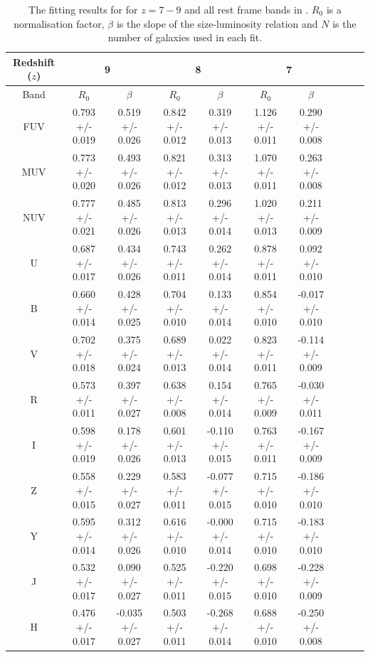 \begin{table}
\begin{center}
\begin{tabular}{ c | c | c | c | c | c | c | c | c | c }
 \hline
 Redshift ($z$) & \multicolumn{2}{|c|}{9} & \multicolumn{2}{|c|}{8} & \multicolumn{2}{|c|}{7} \\ \hline
 Band & $R_0$ & $\beta$& $R_0$ & $\beta$ & $R_0$ & $\beta$ \\ \hline
 FUV 
 & 0.793 +/- 0.019 & 0.519 +/- 0.026
 & 0.842 +/- 0.012 & 0.319 +/- 0.013
 & 1.126 +/- 0.011 & 0.290 +/- 0.008 \\
 MUV 
 & 0.773 +/- 0.020 & 0.493 +/- 0.026
 & 0.821 +/- 0.012 & 0.313 +/- 0.013
 & 1.070 +/- 0.011 & 0.263 +/- 0.008 \\
 NUV 
 & 0.777 +/- 0.021 & 0.485 +/- 0.026
 & 0.813 +/- 0.013 & 0.296 +/- 0.014 
 & 1.020 +/- 0.013 & 0.211 +/- 0.009 \\
 U 
 & 0.687 +/- 0.017 & 0.434 +/- 0.026 
 & 0.743 +/- 0.011 & 0.262 +/- 0.014 
 & 0.878 +/- 0.011 & 0.092 +/- 0.010 \\
 B 
 & 0.660 +/- 0.014 & 0.428 +/- 0.025 
 & 0.704 +/- 0.010 & 0.133 +/- 0.014 
 & 0.854 +/- 0.010 & -0.017 +/- 0.010 \\
 V 
 & 0.702 +/- 0.018 & 0.375 +/- 0.024 
 & 0.689 +/- 0.013 & 0.022 +/- 0.014 
 & 0.823 +/- 0.011 & -0.114 +/- 0.009 \\
 R
 & 0.573 +/- 0.011 & 0.397 +/- 0.027 
 & 0.638 +/- 0.008 & 0.154 +/- 0.014
 & 0.765 +/- 0.009 & -0.030 +/- 0.011 \\
 I
 & 0.598 +/- 0.019 & 0.178 +/- 0.026 
 & 0.601 +/- 0.013 & -0.110 +/- 0.015 
 & 0.763 +/- 0.011 & -0.167 +/- 0.009 \\
 Z
 & 0.558 +/- 0.015 & 0.229 +/- 0.027 
 & 0.583 +/- 0.011 & -0.077 +/- 0.015 
 & 0.715 +/- 0.010 & -0.186 +/- 0.010 \\
 Y
 & 0.595 +/- 0.014 & 0.312 +/- 0.026 
 & 0.616 +/- 0.010 & -0.000 +/- 0.014 
 & 0.715 +/- 0.010 & -0.183 +/- 0.010 \\
 J
 & 0.532 +/- 0.017 & 0.090 +/- 0.027 
 & 0.525 +/- 0.011 & -0.220 +/- 0.015 
 & 0.698 +/- 0.010 & -0.228 +/- 0.009 \\
 H
 & 0.476 +/- 0.017 & -0.035 +/- 0.027 
 & 0.503 +/- 0.011 & -0.268 +/- 0.014
 & 0.688 +/- 0.010 & -0.250 +/- 0.008 \\
 \hline
\end{tabular}
\caption{The fitting results for  for $z=7-9$ and all rest frame bands in . $R_0$ is a normalisation factor, $\beta$ is the slope of the size-luminosity relation and $N$ is the number of galaxies used in each fit.}
\label{tab:colorrfit1}
\end{center}
\end{table}

